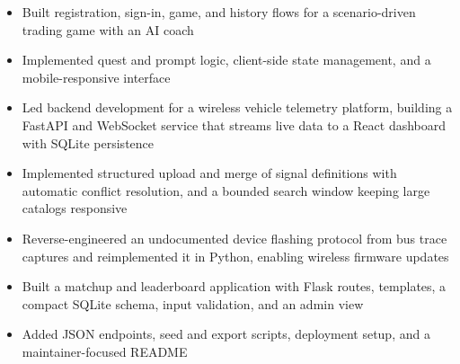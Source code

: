 \documentclass[10pt,letterpaper]{article}
\begin{document}

\begin{itemize}
  \item Built registration, sign-in, game, and history flows for a scenario-driven trading game with an AI coach
  \item Implemented quest and prompt logic, client-side state management, and a mobile-responsive interface
\end{itemize}

\entryspace

\begin{itemize}
  \item Led backend development for a wireless vehicle telemetry platform, building a FastAPI and WebSocket service that streams live data to a React dashboard with SQLite persistence
  \item Implemented structured upload and merge of signal definitions with automatic conflict resolution, and a bounded search window keeping large catalogs responsive
  \item Reverse-engineered an undocumented device flashing protocol from bus trace captures and reimplemented it in Python, enabling wireless firmware updates
\end{itemize}

\entryspace

\begin{itemize}
  \item Built a matchup and leaderboard application with Flask routes, templates, a compact SQLite schema, input validation, and an admin view
  \item Added JSON endpoints, seed and export scripts, deployment setup, and a maintainer-focused README
\end{itemize}
\end{document}
